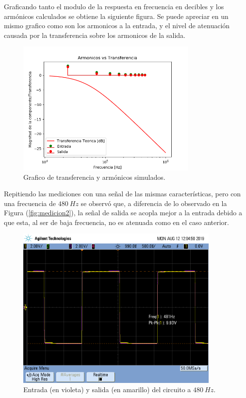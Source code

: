 \documentclass[a4paper]{article}
\begin{document}
Graficando tanto el modulo de la respuesta en frecuencia en decibles y los armónicos calculados se obtiene la siguiente figura. Se puede apreciar en un  mismo grafico como son los armonicos a la entrada, y el nivel de atenuación causada por la transferencia sobre los armonicos de la salida.  

\begin{figure}[H]
	\centering
	\includegraphics[width=0.8\textwidth]{ArmonicosVsTransferencia}
\caption{Grafico de transferencia y armónicos simulados.}
	\label{fig:aromincosvstransf}
\end{figure}

Repitiendo las mediciones con una señal de las mismas características, pero con una frecuencia de $ 480 \ Hz $ se observó que, a diferencia de lo observado en la Figura (\ref{fig:medicion2}), la señal de salida se acopla mejor a la entrada debido a que esta, al ser de baja frecuencia, no es atenuada como en el caso anterior.

\begin{figure}[H]
	\centering
	\includegraphics[width=0.9\textwidth , trim={0.7cm 6.25cm  0 3.5cm},clip]{scope_3}
\caption{Entrada (en violeta) y salida (en amarillo) del circuito a $ 480 \ Hz $.}
	\label{fig:medicion2bajasf}
\end{figure}
\end{document}
